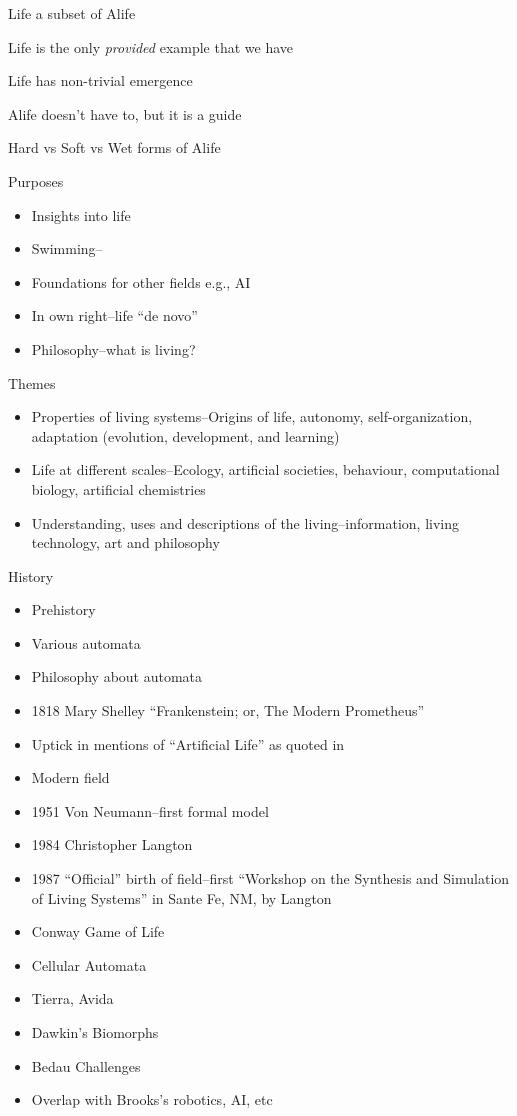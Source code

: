 Life a subset of Alife

Life is the only \emph{provided} example that we have

Life has non-trivial emergence

Alife doesn't have to, but it is a guide

Hard vs Soft vs Wet forms of Alife

Purposes

\begin{itemize}
	\item
	      Insights into life
	\item
	      Swimming--\autocite{Terzopoulos1994}
	\item
	      Foundations for other fields e.g., AI
	\item
	      In own right--life ``de novo''
	\item
	      Philosophy--what is living?
\end{itemize}

Themes \autocite{Aguilar2014}

\begin{itemize}
	\item
	      Properties of living systems--Origins of life, autonomy, self-organization, adaptation (evolution, development, and learning)
	\item
	      Life at different scales--Ecology, artificial societies, behaviour, computational biology, artificial chemistries
	\item
	      Understanding, uses and descriptions of the living--information, living technology, art and philosophy
\end{itemize}

History

\begin{itemize}
	\item Prehistory
	\item Various automata
	\item
	      Philosophy about automata
	\item
	      1818 Mary Shelley ``Frankenstein; or, The Modern Prometheus''
	\item
	      Uptick in mentions of ``Artificial Life'' as quoted in \autocite{Aguilar2014}
	\item
	      Modern field
	\item
	      1951 Von Neumann--first formal model
	\item
	      1984 Christopher Langton
	\item
	      1987 ``Official'' birth of field--first ``Workshop on the Synthesis
	      and Simulation of Living Systems'' in Sante Fe, NM, by Langton
	\item
	      Conway Game of Life
	\item
	      Cellular Automata
	\item
	      Tierra, Avida
	\item
	      Dawkin's Biomorphs
	\item
	      Bedau Challenges
	\item
	      Overlap with Brooks's robotics, AI, etc
\end{itemize}

